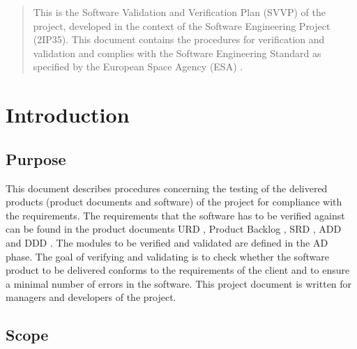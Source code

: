 \documentclass[%
		pathtobase=..,%
		titlefull={Software Validation and Verification Plan},%
		titleabbr=SVVP,%
		version=0.1]{fingerpaint}
\begin{document}
\maketitle

\begin{abstract}
This is the Software Validation and Verification Plan (SVVP) of the \projectname{} project, developed in the context of
the Software Engineering Project (2IP35). This document contains the procedures for verification and validation and complies with the Software Engineering Standard as specified by the European Space Agency (ESA) \cite{esa}.
\end{abstract}

\tableofcontents



\chapter{Introduction}

\section{Purpose}
   This document describes procedures concerning the testing of the delivered products (product
   documents and software) of the \projectname project for compliance with the requirements. The
   requirements that the software has to be verified against can be found in the product documents
   URD \cite{urd}, Product Backlog \cite{backlog}, SRD \cite{srd}, ADD \cite{add} and DDD \cite{ddd}. The modules to be verified and validated are defined
   in the AD phase. The goal of verifying and validating is to check whether the software product to
   be delivered conforms to the requirements of the client and to ensure a minimal number of errors
   in the software. This project document is written for managers and developers of the \projectname
   project.

\section{Scope}
\end{document}
